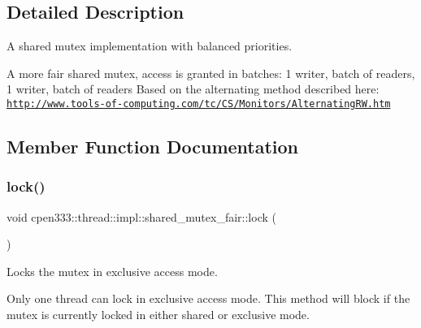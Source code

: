\subsection{Detailed Description}
A shared mutex implementation with balanced priorities. 

A more fair shared mutex, access is granted in batches\+: 1 writer, batch of readers, 1 writer, batch of readers Based on the alternating method described here\+: \href{http://www.tools-of-computing.com/tc/CS/Monitors/AlternatingRW.htm}{\tt http\+://www.\+tools-\/of-\/computing.\+com/tc/\+C\+S/\+Monitors/\+Alternating\+R\+W.\+htm} 

\subsection{Member Function Documentation}
\mbox{\label{classcpen333_1_1thread_1_1impl_1_1shared__mutex__fair_a2a75b9f3ae8336d2181cb098d2dcdf3e}} 
\subsubsection{\texorpdfstring{lock()}{lock()}}
{\footnotesize\ttfamily void cpen333\+::thread\+::impl\+::shared\+\_\+mutex\+\_\+fair\+::lock (\begin{DoxyParamCaption}{ }\end{DoxyParamCaption})\hspace{0.3cm}{\ttfamily [inline]}}



Locks the mutex in exclusive access mode. 

Only one thread can lock in exclusive access mode. This method will block if the mutex is currently locked in either shared or exclusive mode. \mbox{\label{classcpen333_1_1thread_1_1impl_1_1shared__mutex__fair_a0d068ab1af09891a55ac4e066afaf6db}} 
